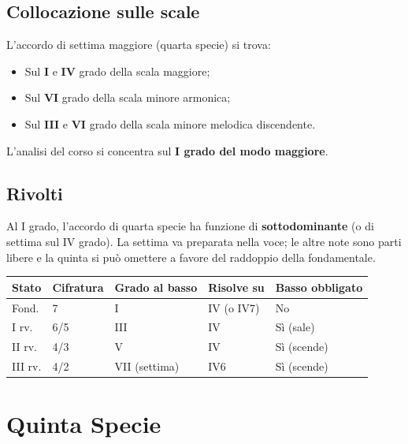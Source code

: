 \begin{esempio}
\end{esempio}

\subsection{Collocazione sulle scale}
\label{subsec:iv7_collocazione}

\begin{regola}
	\label{reg:iv7_gradi}
	L'accordo di settima maggiore (quarta specie) si trova:
	\begin{itemize}
		\item Sul \textbf{I} e \textbf{IV} grado della scala maggiore;
		\item Sul \textbf{VI} grado della scala minore armonica;
		\item Sul \textbf{III} e \textbf{VI} grado della scala minore melodica discendente.
	\end{itemize}
	L'analisi del corso si concentra sul \textbf{I grado del modo maggiore}.
\end{regola}

\subsection{Rivolti}
\label{subsec:iv7_rivolti}

Al I grado, l'accordo di quarta specie ha funzione di \textbf{sottodominante} (o di settima sul IV grado). La settima va preparata nella voce; le altre note sono parti libere e la quinta si può omettere a favore del raddoppio della fondamentale.

\begin{center}
\begin{tabular}{|l|l|l|l|l|}
\hline
Stato & Cifratura & Grado al basso & Risolve su & Basso obbligato \\
\hline
Fond. & 7 & I & IV (o IV7) & No \\
I rv. & 6/5 & III & IV & Sì (sale) \\
II rv. & 4/3 & V & IV & Sì (scende) \\
III rv. & 4/2 & VII (settima) & IV6 & Sì (scende) \\
\hline
\end{tabular}
\end{center}

\section{Quinta Specie}
\label{sec:quinta_specie_dettaglio}

